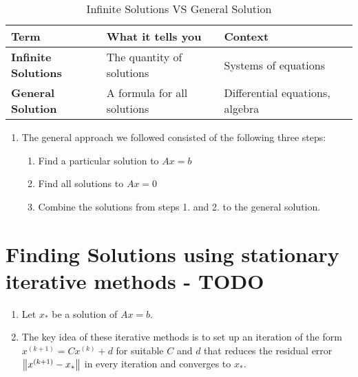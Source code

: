 \begin{customArrayStretch}{1.3}
\begin{table}[H]
    \centering
    \begin{tabular}{|l|l|l|}
        \hline
        \textbf{Term} & 
            \textbf{What it tells you} & 
            \textbf{Context} \\ \hline

        \textbf{Infinite Solutions} & 
            The quantity of solutions & 
            Systems of equations \\ \hline

        \textbf{General Solution} & 
            A formula for all solutions & 
            Differential equations, algebra \\ \hline

    \end{tabular}
    \caption*{Infinite Solutions VS General Solution \cite{common/online/chatgpt}}
\end{table}
\end{customArrayStretch}


\begin{enumerate}
    \item The general approach we followed consisted of the following three steps:
    \begin{enumerate}
        \item Find a particular solution to $Ax = b$
        \hfill \cite{mfml/book/mml/Deisenroth-Faisal-Ong}

        \item Find all solutions to $Ax = 0$
        \hfill \cite{mfml/book/mml/Deisenroth-Faisal-Ong}

        \item Combine the solutions from steps 1. and 2. to the general solution.
        \hfill \cite{mfml/book/mml/Deisenroth-Faisal-Ong}
    \end{enumerate}

    
\end{enumerate}



\section{Finding Solutions using stationary iterative methods - TODO}

\begin{enumerate}
    \item Let $x_\ast$ be a solution of $Ax = b$. 
    \hfill \cite{mfml/book/mml/Deisenroth-Faisal-Ong}
    
    \item The key idea of these iterative methods is to set up an iteration of the form
    $
        x^{(k+1)} = Cx^{(k)} + d
    $
    for suitable $C$ and $d$ that reduces the residual error $\left\| x^{(k+1)} - x_\ast \right\|$ in every iteration and converges to $x_\ast$.
    \hfill \cite{mfml/book/mml/Deisenroth-Faisal-Ong}

\end{enumerate}


